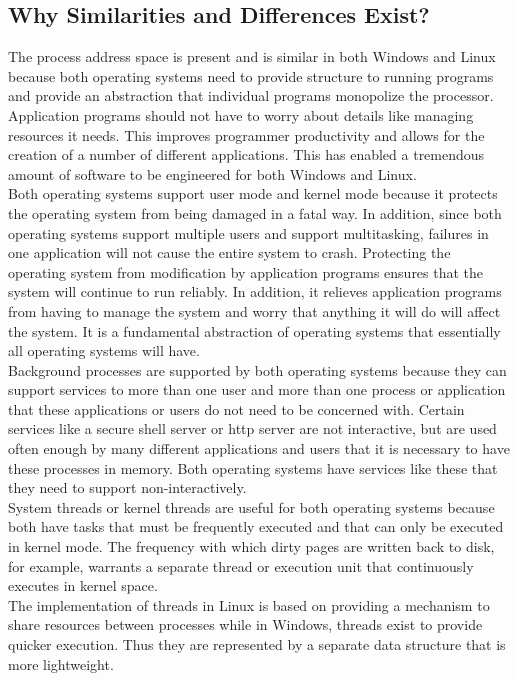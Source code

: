\documentclass[letterpaper,10pt,titlepage]{article}
\begin{document}
\subsection{Why Similarities and Differences Exist?}
The process address space is present and is similar in both Windows and Linux
because both operating systems need to provide structure to running programs
and provide an abstraction that individual programs monopolize the processor.
Application programs should not have to worry about details like managing 
resources it needs. This improves programmer productivity and allows for the
creation of a number of different applications. This has enabled a tremendous 
amount of software to be engineered for both Windows and Linux. 
\\
\linebreak
Both operating systems support user mode and kernel mode because it protects
the operating system from being damaged in a fatal way. In addition, since 
both operating systems support multiple users and support multitasking, 
failures in one application will not cause the entire system to crash. 
Protecting the operating system from modification by application programs 
ensures that the system will continue to run reliably. In addition, it 
relieves application programs from having to manage the system and worry that
anything it will do will affect the system. It is a fundamental abstraction of 
operating systems that essentially all operating systems will have.
\\
\linebreak
Background processes are supported by both operating systems because they can
support services to more than one user and more than one process or 
application that these applications or users do not need to be concerned with.
Certain services like a secure shell server or http server are not 
interactive, but are used often enough by many different applications and 
users that it is necessary to have these processes in memory. Both operating
systems have services like these that they need to support non-interactively.
\\
\linebreak
System threads or kernel threads are useful for both operating systems 
because both have tasks that must be frequently executed and that can only be
executed in kernel mode. The frequency with which dirty pages are written 
back to disk, for example,  warrants a separate thread or execution unit that
continuously executes in kernel space. 
\\
\linebreak
The implementation of threads in Linux is based on providing a mechanism to 
share resources between processes while in Windows, threads exist to provide
quicker execution. Thus they are represented by a separate data structure that 
is more lightweight.
\end{document}

